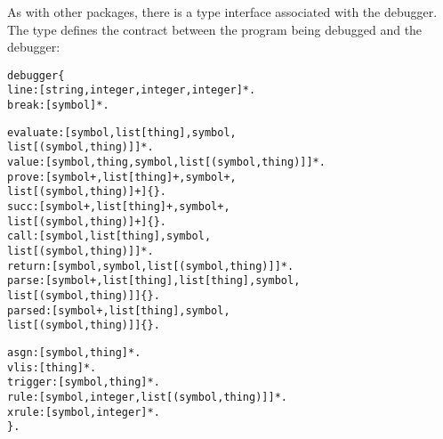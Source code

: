 As with other packages, there is a type interface associated with the debugger. The  type defines the contract between the program being debugged and the debugger:
\begin{alltt}
debugger \impl \{
  line:[string,integer,integer,integer]*.
  break:[symbol]*.

  evaluate:[symbol,list[thing],symbol,
            list[(symbol,thing)]]*.
  value:[symbol,thing,symbol,list[(symbol,thing)]]*.
  prove:[symbol+,list[thing]+,symbol+,
         list[(symbol,thing)]+]\{\}.
  succ:[symbol+,list[thing]+,symbol+,
        list[(symbol,thing)]+]\{\}.
  call:[symbol,list[thing],symbol,
        list[(symbol,thing)]]*.
  return:[symbol,symbol,list[(symbol,thing)]]*.
  parse:[symbol+,list[thing],list[thing],symbol,
         list[(symbol,thing)]]\{\}.
  parsed:[symbol+,list[thing],symbol,
          list[(symbol,thing)]]\{\}.

  asgn:[symbol,thing]*.
  vlis:[thing]*.
  trigger:[symbol,thing]*.
  rule:[symbol,integer,list[(symbol,thing)]]*.
  xrule:[symbol,integer]*.
\}.
\end{alltt}
